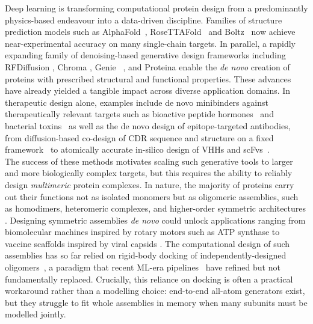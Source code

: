 \documentclass{article}
\theoremstyle{plain}
\theoremstyle{definition}
\theoremstyle{remark}
\begin{document}
Deep learning is transforming computational protein design from a predominantly physics-based endeavour into a data-driven discipline. Families of structure prediction models such as AlphaFold~\cite{jumper_highly_2021, abramson_accurate_2024}, RoseTTAFold~\cite{baek_accurate_2021, baek_efficient_2023, corley_accelerating_2025} and Boltz~\cite{wohlwend_boltz-1_2024, passaro_boltz-2_2025} now achieve near-experimental accuracy on many single-chain targets. In parallel, a rapidly expanding family of denoising-based generative design frameworks including RFDiffusion \citep{watson_novo_2023, butcher_novo_2025}, Chroma \citep{ingraham_illuminating_2023}, Genie~ \citep{lin_generating_2023, lin_out_2024}, and Proteina \citep{geffner_proteina_2025, geffner_-proteina_2025, didi_scaling_2026} 
enable the \emph{de novo} creation of proteins with prescribed structural and functional properties. These advances have already yielded a tangible impact across diverse application domains. In therapeutic design alone, examples include de novo minibinders against therapeutically relevant targets such as
bioactive peptide hormones~\cite{vazquez_torres_novo_2024} and bacterial toxins~\cite{ragotte_novo_2025} as well as the de novo design of epitope-targeted antibodies, from
diffusion-based co-design of CDR sequence and structure on a fixed
framework~\cite{luo_antigen-specific_2022} to atomically accurate
in-silico design of VHHs and scFvs~\cite{bennett_atomically_2026}. \\


The success of these methods motivates scaling such generative tools to larger and more biologically complex targets, but this requires the ability to reliably design \emph{multimeric} protein complexes. In nature, the majority of proteins carry out their functions not as isolated monomers but as oligomeric assemblies, such as homodimers, heteromeric complexes, and higher-order symmetric architectures \cite{goodsell_structural_2000, marsh_structure_2015}. Designing symmetric assemblies \emph{de novo} could unlock applications ranging from biomolecular machines inspired by rotary motors such as ATP synthase \cite{courbet_computational_2022} to vaccine scaffolds inspired by viral capsids \cite{butterfield_evolution_2017, marcandalli_induction_2019, walls_elicitation_2020}. The computational design of such assemblies has so far relied on rigid-body docking of independently-designed oligomers~\citep{king_computational_2012, bale_accurate_2016, hsia_design_2016, sheffler_fast_2023}, a paradigm that recent ML-era pipelines~\citep{ de_haas_rapid_2024, haas_sequence_2025, haas_novo_2026} have refined but not fundamentally replaced. Crucially, this reliance on docking is often a practical workaround rather than a modelling choice: end-to-end all-atom generators exist, but they struggle to fit whole assemblies in memory when many subunits must be modelled jointly. \\
\end{document}
